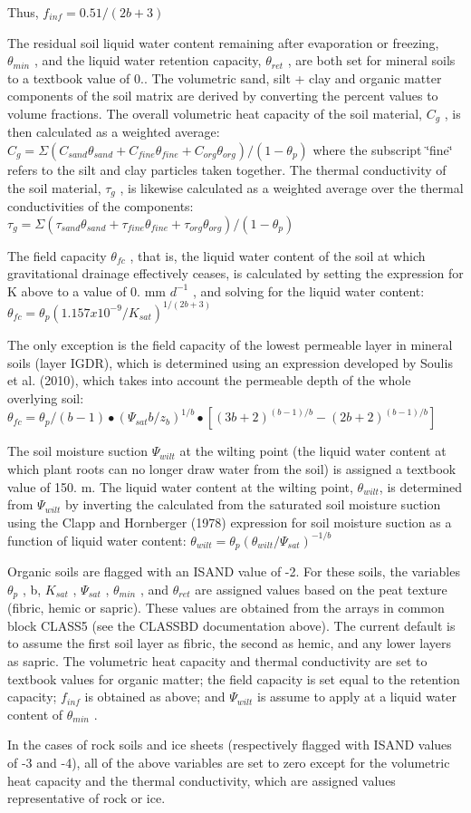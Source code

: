 Thus, $f_{inf} = 0.5 1/(2b+3)$

The residual soil liquid water content remaining after evaporation or freezing, $\theta_{min}$ , and the liquid water retention capacity, $\theta_{ret}$ , are both set for mineral soils to a textbook value of 0.. The volumetric sand, silt + clay and organic matter components of the soil matrix are derived by converting the percent values to volume fractions. The overall volumetric heat capacity of the soil material, $C_g$ , is then calculated as a weighted average\+: $C_g = \Sigma (C_{sand} \theta_{sand} + C_{fine} \theta_{fine} + C_{org} \theta_{org} )/(1 - \theta_p )$ where the subscript \char`\"{}fine\char`\"{} refers to the silt and clay particles taken together. The thermal conductivity of the soil material, $\tau_g$ , is likewise calculated as a weighted average over the thermal conductivities of the components\+: $\tau_g = \Sigma (\tau_{sand} \theta_{sand} + \tau_{fine} \theta_{fine} + \tau_{org} \theta_{org} )/(1 - \theta_p )$

The field capacity $\theta_{fc}$ , that is, the liquid water content of the soil at which gravitational drainage effectively ceases, is calculated by setting the expression for K above to a value of 0. mm $d^{-1}$ , and solving for the liquid water content\+: $\theta_{fc} = \theta_p (1.157 x 10^{-9} /K_{sat} )^{1/(2b + 3)}$

The only exception is the field capacity of the lowest permeable layer in mineral soils (layer I\+G\+D\+R), which is determined using an expression developed by Soulis et al. (2010), which takes into account the permeable depth of the whole overlying soil\+: $\theta_{fc} = \theta_p /(b-1) \bullet (\Psi_{sat} b/ z_b )^{1/b} \bullet [(3b+2)^{(b-1)/b} - (2b+2)^{(b-1)/b} ]$

The soil moisture suction $\Psi_{wilt}$ at the wilting point (the liquid water content at which plant roots can no longer draw water from the soil) is assigned a textbook value of 150. m. The liquid water content at the wilting point, $ \theta_{wilt} $, is determined from $\Psi_{wilt}$ by inverting the calculated from the saturated soil moisture suction using the Clapp and Hornberger (1978) \cite{Clapp1978-898} expression for soil moisture suction as a function of liquid water content\+: $ \theta_{wilt} = \theta_p (\theta_{wilt} / \Psi_{sat} )^{-1/b} $

Organic soils are flagged with an I\+S\+A\+N\+D value of -\/2. For these soils, the variables $\theta_p$ , b, $K_{sat}$ , $\Psi_{sat}$ , $\theta_{min}$ , and $\theta_{ret}$ are assigned values based on the peat texture (fibric, hemic or sapric). These values are obtained from the arrays in common block C\+L\+A\+S\+S5 (see the C\+L\+A\+S\+S\+B\+D documentation above). The current default is to assume the first soil layer as fibric, the second as hemic, and any lower layers as sapric. The volumetric heat capacity and thermal conductivity are set to textbook values for organic matter; the field capacity is set equal to the retention capacity; $f_{inf}$ is obtained as above; and $\Psi_{wilt}$ is assume to apply at a liquid water content of $\theta_{min}$ .

In the cases of rock soils and ice sheets (respectively flagged with I\+S\+A\+N\+D values of -\/3 and -\/4), all of the above variables are set to zero except for the volumetric heat capacity and the thermal conductivity, which are assigned values representative of rock or ice.